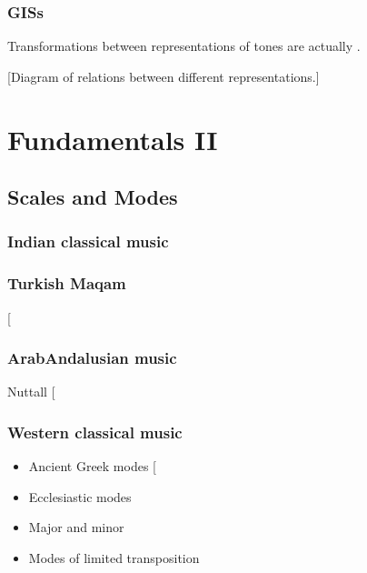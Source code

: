\documentclass[letterpaper,10pt,english]{sphinxmanual}
\begin{document}
\subsection{GISs}
\label{\detokenize{1_fundamentals:giss}}
Transformations between representations of tones are actually .

{[}Diagram of relations between different representations.{]}


\chapter{Fundamentals II}
\label{\detokenize{1_fundamentals:fundamentals-ii}}

\section{Scales and Modes}
\label{\detokenize{1_fundamentals:scales-and-modes}}

\subsection{Indian classical music}
\label{\detokenize{1_fundamentals:indian-classical-music}}

\subsection{Turkish Maqam}
\label{\detokenize{1_fundamentals:turkish-maqam}}
 {[}\sphinxcite{8_bibliography:id22}{]}


\subsection{Arab\sphinxhyphen{}Andalusian music}
\label{\detokenize{1_fundamentals:arab-andalusian-music}}
Nuttall  {[}\sphinxcite{8_bibliography:id23}{]}


\subsection{Western classical music}
\label{\detokenize{1_fundamentals:western-classical-music}}\begin{itemize}
\item {} 
Ancient Greek modes {[}\sphinxcite{8_bibliography:id21}{]}

\item {} 
Ecclesiastic modes

\item {} 
Major and minor

\item {} 
Modes of limited transposition

\end{itemize}
\end{document}
